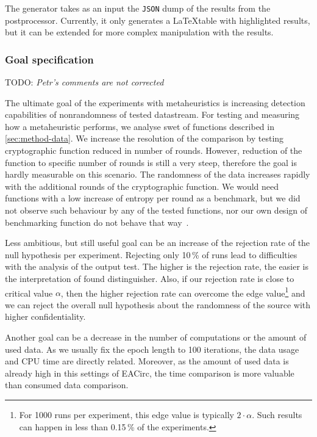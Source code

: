\documentclass[
  print, %
  Table,   %
  nolof,     %
  nolot,     %
  11pt, %
  oneside  %
]{fithesis3}
\newcommand{\todo}[1]{TODO: \textit{#1}}
\begin{document}
The generator takes as an input the \texttt{JSON} dump of the results from the postprocessor. Currently, it only generates a \LaTeX table with highlighted results, but it can be extended for more complex manipulation with the results.

\subsubsection{\textbf{Goal specification}}
\label{subsubsec:method-spec-ss-goal}

\todo{Petr's comments are not corrected}

The ultimate goal of the experiments with metaheuristics is increasing detection capabilities of nonrandomness of tested datastream. For testing and measuring how a metaheuristic performs, we analyse swet of functions described in \cref{sec:method-data}. We increase the resolution of the comparison by testing cryptographic function reduced in number of rounds. However, reduction of the function to specific number of rounds is still a very steep, therefore the goal is hardly measurable on this scenario. The randomness of the data increases rapidly with the additional rounds of the cryptographic function. We would need functions with a low increase of entropy per round as a benchmark, but we did not observe such behaviour by any of the tested functions, nor our own design of benchmarking function do not behave that way~\cite{EACirc-lut}.

Less ambitious, but still useful goal can be an increase of the rejection rate of the null hypothesis per experiment. Rejecting only 10\,\% of runs lead to difficulties with the analysis of the output test. The higher is the rejection rate, the easier is the interpretation of found distinguisher. Also, if our rejection rate is close to critical value $\alpha$, then the higher rejection rate can overcome the edge value\footnote{For 1000 runs per experiment, this edge value is typically $2\cdot\alpha$. Such results can happen in less than 0.15\,\% of the experiments.} and we can reject the overall null hypothesis about the randomness of the source with higher confidentiality.

Another goal can be a decrease in the number of computations or the amount of used data. As we usually fix the epoch length to 100 iterations, the data usage and CPU time are directly related. Moreover, as the amount of used data is already high in this settings of EACirc, the time comparison is more valuable than consumed data comparison.
\end{document}
